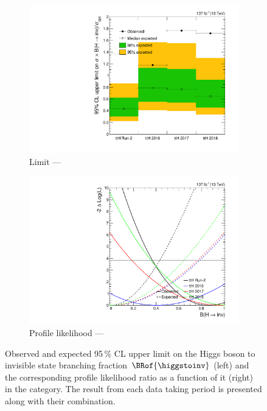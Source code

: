 \begin{figure}[htbp]
    \centering
    \begin{subfigure}[b]{0.45\textwidth}
        \includegraphics[width=\textwidth]{figures/limits/ttH/limit_Run2_ttH.pdf}
        \caption{Limit --- \ttH}
    \end{subfigure}
    \hspace{0.05\textwidth}
    \begin{subfigure}[t]{0.45\textwidth}
        \includegraphics[width=\textwidth]{figures/likelihood_scan/profile_likelihood_scan_Run2_ttH.pdf}
        \caption{Profile likelihood --- \ttH}
    \end{subfigure}
    \caption[Observed and expected 95\,\% CL upper limit on the Higgs boson to invisible state branching fraction $\BRof{\higgstoinv}$ (left) and the corresponding profile likelihood ratio as a function of it (right) in the \ttH category]{Observed and expected 95\,\% CL upper limit on the Higgs boson to invisible state branching fraction $\BRof{\higgstoinv}$ (left) and the corresponding profile likelihood ratio as a function of it (right) in the \ttH category. The result from each data taking period is presented along with their combination.}
    \label{fig:htoinv_limit_ttH}
\end{figure}

